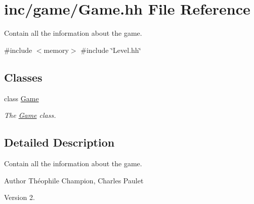 \hypertarget{Game_8hh}{}\section{inc/game/\+Game.hh File Reference}
\label{Game_8hh}


Contain all the information about the game.  


{\ttfamily \#include $<$memory$>$}\newline
{\ttfamily \#include \char`\"{}Level.\+hh\char`\"{}}\newline
\subsection*{Classes}
\begin{DoxyCompactItemize}
\item 
class \hyperlink{classGame}{Game}
\begin{DoxyCompactList}\small\item\em The \hyperlink{classGame}{Game} class. \end{DoxyCompactList}\end{DoxyCompactItemize}


\subsection{Detailed Description}
Contain all the information about the game. 

\begin{DoxyAuthor}{Author}
Théophile Champion, Charles Paulet 
\end{DoxyAuthor}
\begin{DoxyVersion}{Version}
2. 
\end{DoxyVersion}

